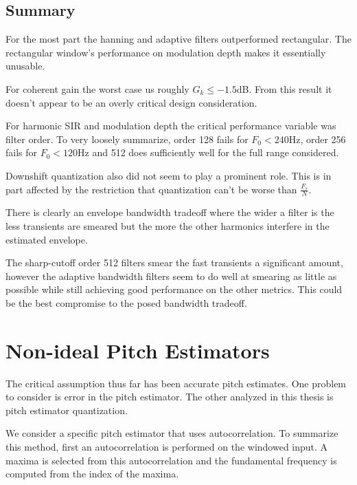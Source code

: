 \documentclass [11pt, proquest,oneside] {ganter_thesis}[2015/03/03]
\begin{document}
\clearpage

\subsection{Summary}

For the most part the hanning and adaptive filters outperformed rectangular.  The rectangular window's performance on modulation depth makes it essentially unusable.

For coherent gain the worst case us roughly $G_k \leq -1.5$dB.  From this result it doesn't appear to be an overly critical design consideration.

For harmonic SIR and modulation depth the critical performance variable was filter order.  To very loosely summarize, order 128 fails for $F_0 < 240$Hz, order 256 fails for $F_0 < 120$Hz and 512 does sufficiently well for the full range considered.

Downshift quantization also did not seem to play a prominent role.  This is in part affected by the restriction that quantization can't be worse than $\frac{F_s}{N}$.

There is clearly an envelope bandwidth tradeoff where the wider a filter is the less transients are smeared but the more the other harmonics interfere in the estimated envelope.

The sharp-cutoff order 512 filters smear the fast transients a significant amount, however the adaptive bandwidth filters seem to do well at smearing as little as possible while still achieving good performance on the other metrics.  This could be the best compromise to the posed bandwidth tradeoff.


\section{Non-ideal Pitch Estimators}

The critical assumption thus far has been accurate pitch estimates.  One problem to consider is error in the pitch estimator.  The other analyzed in this thesis is pitch estimator quantization.

We consider a specific pitch estimator that uses autocorrelation.  To summarize this method, first an autocorrelation is performed on the windowed input.  A maxima is selected from this autocorrelation and the fundamental frequency is computed from the index of the maxima.
\end{document}
